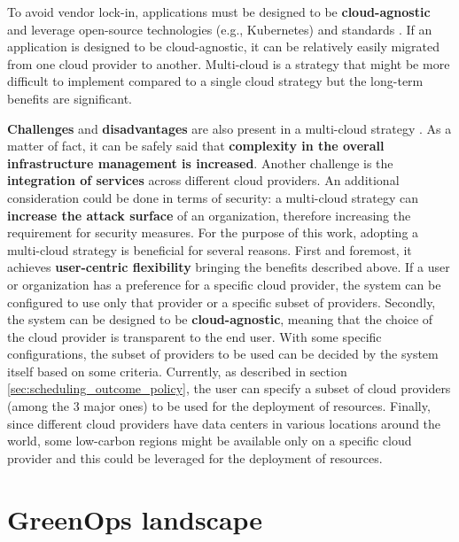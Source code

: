 To avoid vendor lock-in, applications must be designed to be \textbf{cloud-agnostic} and leverage open-source technologies (e.g., Kubernetes) and standards \cite{google_multicloud}.
If an application is designed to be cloud-agnostic, it can be relatively easily migrated from one cloud provider to another.
Multi-cloud is a strategy that might be more difficult to implement compared to a single cloud strategy but the long-term benefits are significant.

\textbf{Challenges} and \textbf{disadvantages} are also present in a multi-cloud strategy \cite{google_multicloud}.
As a matter of fact, it can be safely said that \textbf{complexity in the overall infrastructure management is increased}.
Another challenge is the \textbf{integration of services} across different cloud providers.
An additional consideration could be done in terms of security: a multi-cloud strategy can \textbf{increase the attack surface} of an organization, therefore increasing the requirement for security measures.
\newline
For the purpose of this work, adopting a multi-cloud strategy is beneficial for several reasons.
First and foremost, it achieves \textbf{user-centric flexibility} bringing the benefits described above.
If a user or organization has a preference for a specific cloud provider, the system can be configured to use only that provider or a specific subset of providers.
Secondly, the system can be designed to be \textbf{cloud-agnostic}, meaning that the choice of the cloud provider is transparent to the end user. 
With some specific configurations, the subset of providers to be used can be decided by the system itself based on some criteria.
Currently, as described in section \ref{sec:scheduling_outcome_policy}, the user can specify a subset of cloud providers (among the 3 major ones) to be used for the deployment of resources.
Finally, since different cloud providers have data centers in various locations around the world, some low-carbon regions might be available only on a specific cloud provider and this could be leveraged for the deployment of resources.

\section{GreenOps landscape}

